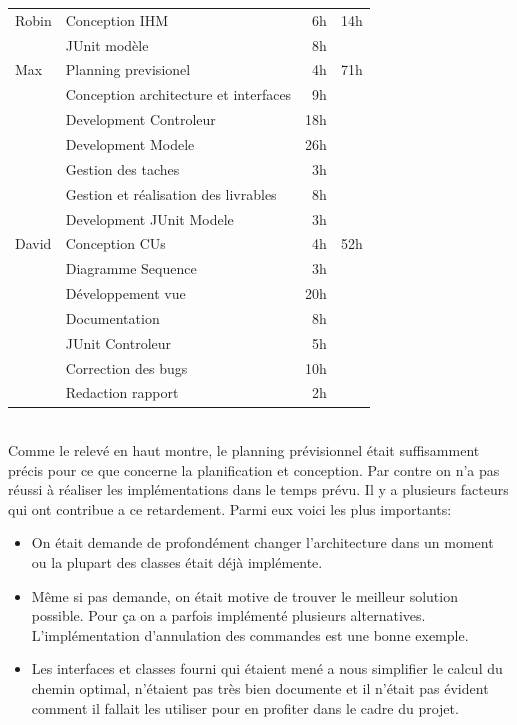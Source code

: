 \documentclass[10pt,a4paper]{book}
\begin{document}
\begin{longtable}{|l|l|r|l|}
\hline
Robin & Conception IHM & 6h & 14h\\
\cline{2-3}
& JUnit modèle & 8h & ~\\
\hline

\hline
Max & Planning previsionel & 4h & 71h\\
\cline{2-3}
& Conception architecture et interfaces & 9h & ~\\
\cline{2-3}
& Development Controleur & 18h & ~\\
\cline{2-3}
& Development Modele & 26h & ~\\
\cline{2-3}
& Gestion des taches & 3h & ~\\
\cline{2-3}
& Gestion et réalisation des livrables & 8h & ~\\
\cline{2-3}
& Development JUnit Modele & 3h & ~\\
\hline

\hline
David & Conception CUs & 4h & 52h\\
\cline{2-3}
& Diagramme Sequence & 3h & ~\\
\cline{2-3}
& Développement vue & 20h & ~\\
\cline{2-3}
& Documentation & 8h & ~\\
\cline{2-3}
& JUnit Controleur & 5h & ~\\
\cline{2-3}
& Correction des bugs & 10h & ~\\
\cline{2-3}
& Redaction rapport & 2h & ~\\
\hline
\end{longtable}
~\\Comme le relevé en haut montre, le planning prévisionnel était suffisamment précis pour ce que concerne la planification et conception. Par contre on n'a pas réussi à réaliser les implémentations dans le temps prévu. Il y a plusieurs facteurs qui ont contribue a ce retardement. Parmi eux voici les plus importants:
\begin{itemize}
	\item{On était demande de profondément changer l'architecture dans un moment ou la plupart des classes était déjà implémente.}
	\item{Même si pas demande, on était motive de trouver le meilleur solution possible. Pour ça on a parfois implémenté plusieurs alternatives. L'implémentation d'annulation des commandes est une bonne exemple.}
	\item{Les interfaces et classes fourni qui étaient mené a nous simplifier le calcul du chemin optimal, n'étaient pas très bien documente et il n'était pas évident comment il fallait les utiliser pour en profiter dans le cadre du projet.}
\end{itemize}
\end{document}
